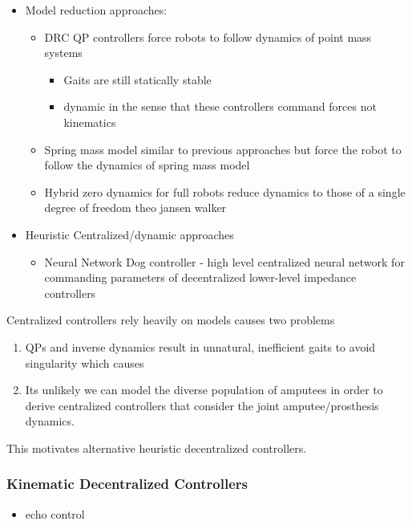 \begin{itemize}
    \item Model reduction approaches:        
        \begin{itemize}
            \item DRC  QP controllers force robots to follow dynamics of
                point mass systems
            \begin{itemize}
                \item Gaits are still statically stable
                \item dynamic in the sense that these controllers command forces
                    not kinematics
            \end{itemize}


            \item Spring mass model similar to previous approaches but force
            the robot to follow the dynamics of spring mass model

            \item Hybrid zero dynamics for full robots reduce dynamics to
            those of a single degree of freedom theo jansen walker
        \end{itemize}

    \item Heuristic Centralized/dynamic approaches
    \begin{itemize}
        \item Neural Network Dog controller - high level centralized neural
        network for commanding parameters of decentralized lower-level
        impedance controllers
    \end{itemize}
\end{itemize}

Centralized controllers rely heavily on models causes two problems
\begin{enumerate}
\item QPs and inverse dynamics result in unnatural, inefficient gaits to avoid
singularity which causes
\item Its unlikely we can model the diverse population of amputees in order
to derive centralized controllers that consider the joint amputee/prosthesis
dynamics.
\end{enumerate}
This motivates alternative heuristic decentralized controllers.

\subsubsection{Kinematic Decentralized Controllers}
    \begin{itemize}
        \item echo control
    \end{itemize}
